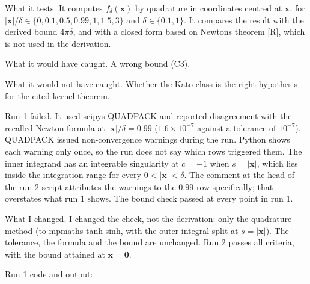 \documentclass[11pt,a4paper]{article}
\begin{document}
What it tests. It computes \(f_\delta(\mathbf x)\) by quadrature in coordinates centred at \(\mathbf x\), for \(|\mathbf x|/\delta\in\{0,0.1,0.5,0.99,1,1.5,3\}\) and \(\delta\in\{0.1,1\}\). It compares the result with the derived bound \(4\pi\delta\), and with a closed form based on Newton\textquotesingle s theorem {[}R{]}, which is not used in the derivation.

What it would have caught. A wrong bound (C3).

What it would not have caught. Whether the Kato class is the right hypothesis for the cited kernel theorem.

Run 1 failed. It used scipy\textquotesingle s QUADPACK and reported disagreement with the recalled Newton formula at \(|\mathbf x|/\delta=0.99\) (\(1.6\times10^{-7}\) against a tolerance of \(10^{-7}\)). QUADPACK issued non-convergence warnings during the run. Python shows each warning only once, so the run does not say which rows triggered them. The inner integrand has an integrable singularity at \(c=-1\) when \(s=|\mathbf x|\), which lies inside the integration range for every \(0<|\mathbf x|<\delta\). The comment at the head of the run-2 script attributes the warnings to the \(0.99\) row specifically; that overstates what run 1 shows. The bound check passed at every point in run 1.

What I changed. I changed the check, not the derivation: only the quadrature method (to mpmath\textquotesingle s tanh-sinh, with the outer integral split at \(s=|\mathbf x|\)). The tolerance, the formula and the bound are unchanged. Run 2 passes all criteria, with the bound attained at \(\mathbf x=\mathbf 0\).

Run 1 code and output:
\end{document}
